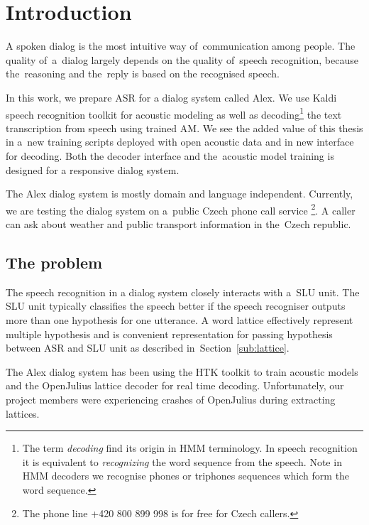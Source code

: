 \chapter{Introduction}
\label{chap:intro}

A spoken dialog is the most intuitive way of~communication among people. 
The quality of~a~dialog largely depends on the quality 
of~speech recognition, because the~reasoning and the~reply is based on the recognised speech. 

In this work, we prepare \acl{ASR} for a dialog system called Alex. 
We use Kaldi\cite{povey2011kaldi} speech recognition toolkit for acoustic modeling 
as well as decoding\footnote{The term {\it decoding} find its origin in \acs{HMM} terminology. In speech recognition it is equivalent to {\it recognizing} the word sequence from the speech. Note in HMM decoders we recognise phones or triphones sequences which form the word sequence.} the text transcription from speech using trained \acl{AM}.
We see the added value of this thesis in a~new training scripts deployed with open acoustic data\cite{korvas_2014}
and in new interface for decoding. Both the decoder interface and the~acoustic model training is designed 
for a responsive dialog system. 

The Alex dialog system is mostly domain and language independent.
Currently, we are testing the dialog system on a~public Czech phone call service
\footnote{The phone line +420 800 899 998 is for free for Czech callers.}.
A caller can ask about weather and public transport information in the~Czech republic.

\section{The problem} 
\label{sec:problem}

The speech recognition in a dialog system closely interacts with a~\acl{SLU} unit.
The \ac{SLU} unit typically classifies the speech better 
if the speech recogniser outputs more than one hypothesis for one utterance. 
A word lattice effectively represent multiple hypothesis and is convenient
representation for passing hypothesis between \ac{ASR} and \ac{SLU} unit 
as described in~Section~\ref{sub:lattice}.

The Alex dialog system has been using the \ac{HTK} toolkit\cite{young94htk} 
to train acoustic models and 
the OpenJulius\cite{lee2009julius} lattice decoder for real time decoding. 
Unfortunately, our project members were experiencing crashes 
of OpenJulius during extracting lattices.

